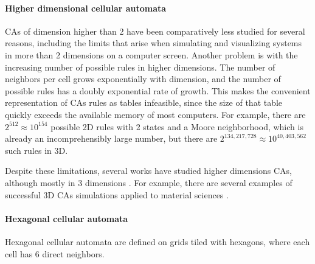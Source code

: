 \paragraph{Higher dimensional cellular automata}
\acp{CA} of dimension higher than 2 have been comparatively less studied for
several reasons, including the limits that arise when simulating and visualizing
systems in more than 2 dimensions on a computer screen. Another problem is with
the increasing number of possible rules in higher dimensions. The number of
neighbors per cell grows exponentially with dimension, and the number of
possible rules has a doubly exponential rate of growth. This makes the
convenient representation of \acp{CA} rules as tables infeasible, since the size
of that table quickly exceeds the available memory of most computers. For
example, there are $2^{512} \approx 10^{154}$ possible 2D rules with 2 states and a
Moore neighborhood, which is already an incomprehensibly large number, but there
are $2^{134,217,728} \approx 10^{40,403,562}$ such rules in 3D.

Despite these limitations, several works have studied higher dimensions \acp{CA},
although mostly in 3 dimensions
\parencite{tsalidesThreedimensionalCellularAutomata1989,
  sudhakaranGrowing3DArtefacts2021}. For example, there are several examples of
successful 3D \acp{CA} simulations applied to material sciences
\parencite{gandin3DCellularAutomaton1997, arataFreeformShapeModeling1999,
  panStudyFailureScale2009, dicaprio3DCellularAutomata2016}.

\paragraph{Hexagonal cellular automata}
Hexagonal cellular automata are defined on grids tiled with hexagons, where each
cell has 6 direct neighbors.

